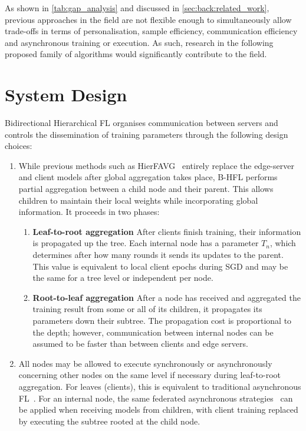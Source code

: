 As shown in \cref{tab:gap_analysis} and discussed in \cref{sec:back:related_work}, previous approaches in the field are not flexible enough to simultaneously allow trade-offs in terms of personalisation, sample efficiency, communication efficiency and asynchronous training or execution. As such, research in the following proposed family of algorithms would significantly contribute to the field.
\section{System Design}\label{sec:proposal:system_design}

Bidirectional Hierarchical FL organises communication between servers and controls the dissemination of training parameters through the following design choices:
\begin{singlespace*}
    \begin{enumerate}
        \item While previous methods such as HierFAVG~\citep{Client-Edge-CloudHierFL,Hier_Het_Cellular} entirely replace the edge-server and client models after global aggregation takes place, B-HFL performs partial aggregation between a child node and their parent. This
              allows children to maintain their local weights while incorporating global information. It proceeds in two phases:

              \begin{enumerate}
                  \item \textbf{Leaf-to-root aggregation} After clients finish training, their information is propagated up the tree. Each internal node has a parameter $T_n$, which determines after how many rounds it sends its updates to the parent. This value is equivalent to local client epochs during SGD and may be the same for a tree level or independent per node.
                  \item \textbf{Root-to-leaf aggregation} After a node has received and aggregated the training result from some or all of its children, it propagates its parameters down their subtree. The propagation cost is proportional to the depth; however, communication between internal nodes can be assumed to be faster than between clients and edge servers.
              \end{enumerate}

        \item All nodes may be allowed to execute synchronously or asynchronously concerning other nodes on the same level if necessary during leaf-to-root aggregation. For leaves (clients), this is equivalent to traditional asynchronous FL~\citep{AsynchronousFLonHetDevicesSurvey}. For an internal node, the same federated asynchronous strategies~\citep{FedBuff,PAPAYA} can be applied when receiving models from children, with client training replaced by executing the subtree rooted at the child node.


\end{enumerate}
\end{singlespace*}
